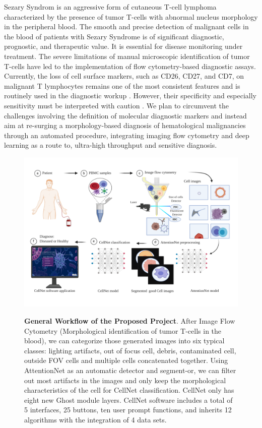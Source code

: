 Sezary Syndrom is an aggressive form of cutaneous T-cell lymphoma characterized by the presence of tumor T-cells with abnormal nucleus morphology in the peripheral blood. The smooth and precise detection of malignant cells in the blood of patients with Sezary Syndrome is of significant diagnostic, prognostic, and therapeutic value. It is essential for disease monitoring under treatment\cite{6}\cite{7}. The severe limitations of manual microscopic identification of tumor T-cells have led to the implementation of flow cytometry-based diagnostic assays. Currently, the loss of cell surface markers, such as CD26, CD27, and CD7, on malignant T lymphocytes remains one of the most consistent features and is routinely used in the diagnostic workup \cite{12}. However, their specificity and especially sensitivity must be interpreted with caution \cite{11}. We plan to circumvent the challenges involving the definition of molecular diagnostic markers and instead aim at re-surging a morphology-based diagnosis of hematological malignancies through an automated procedure, integrating imaging flow cytometry and deep learning as a route to, ultra-high throughput and sensitive diagnosis.
 
\label{sub:figures}
\begin{figure}[ht]
	\begin{center}
	\includegraphics[width=\textwidth]{thesis-template-master/images/general workflow2.pdf}
	\label{fig:lenna}
	\end{center}
	\caption{\textbf{General Workflow of the Proposed Project}. After Image Flow Cytometry (Morphological identification of tumor T-cells in the blood), we can categorize those generated images into six typical classes: lighting artifacts, out of focus cell, debris, contaminated cell, outside FOV cells and multiple cells concatenated together. Using AttentionNet as an automatic detector and segment-or, we can filter out most artifacts in the images and only keep the morphological characteristics of the cell for CellNet classification. CellNet only has eight new Ghost module layers. CellNet software includes a total of 5 interfaces, 25 buttons, ten user prompt functions, and inherits 12 algorithms with the integration of 4 data sets.}
	\label{fig:1.2}
\end{figure}



